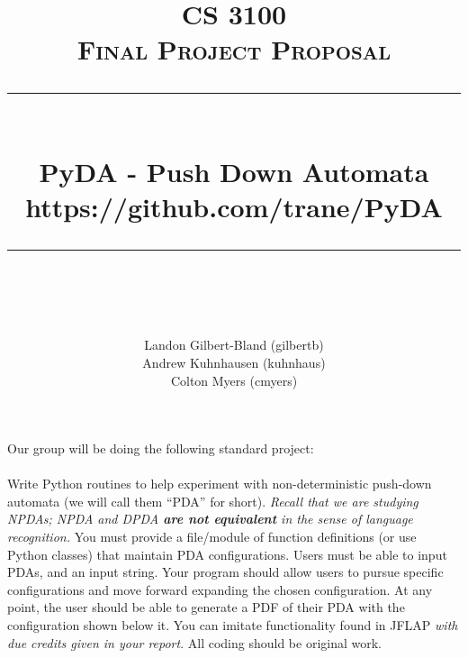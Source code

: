\documentclass[a4paper]{report}
\newcommand{\HRule}{\rule{\linewidth}{0.5mm}}
\begin{document}
\title{ %
    \textsc{\LARGE CS 3100}\\[1.5cm]
    \textsc{\Large Final Project Proposal}\\[0.5cm]
    \HRule \\[0.4cm]
    { \huge \bfseries PyDA - Push Down Automata}\\
    { \small https://github.com/trane/PyDA }\\
    \HRule \\[1.5cm]
}
\author{
    Landon Gilbert-Bland (gilbertb)\\ %
    Andrew Kuhnhausen (kuhnhaus)\\%
    Colton Myers (cmyers)\\%
}
\maketitle

Our group will be doing the following standard project:\\\\
\vbox{
Write Python routines to help experiment with non-deterministic push-down
automata (we will call them ``PDA'' for short). {\em Recall that we are studying
NPDAs; NPDA and DPDA {\bf are not equivalent} in the sense of language
recognition.} You must provide a file/module of function definitions (or use
Python classes) that maintain PDA configurations. Users must be able to input
PDAs, and an input string. Your program should allow users to pursue specific
configurations and move forward expanding the chosen configuration. At any
point, the user should be able to generate a PDF of their PDA with the
configuration shown below it. You can imitate functionality found in JFLAP {\em
with due credits given in your report}. All coding should be original work.
}
\end{document}
